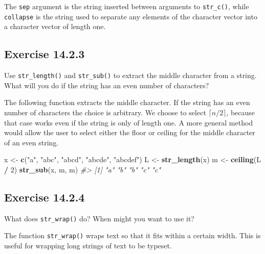 \documentclass[]{book}
\newenvironment{Shaded}{\begin{snugshade}}{\end{snugshade}}
\newcommand{\CommentTok}[1]{\textcolor[rgb]{0.56,0.35,0.01}{\textit{#1}}}
\newcommand{\DecValTok}[1]{\textcolor[rgb]{0.00,0.00,0.81}{#1}}
\newcommand{\KeywordTok}[1]{\textcolor[rgb]{0.13,0.29,0.53}{\textbf{#1}}}
\newcommand{\NormalTok}[1]{#1}
\newcommand{\OperatorTok}[1]{\textcolor[rgb]{0.81,0.36,0.00}{\textbf{#1}}}
\newcommand{\StringTok}[1]{\textcolor[rgb]{0.31,0.60,0.02}{#1}}
\theoremstyle{plain}
\theoremstyle{remark}
\begin{document}
The \texttt{sep} argument is the string inserted between arguments to
\texttt{str\_c()}, while \texttt{collapse} is the string used to
separate any elements of the character vector into a character vector of
length one.

\hypertarget{exercise-14.2.3}{%
\subsection*{\texorpdfstring{Exercise
{14.2.3}}{Exercise 14.2.3}}\label{exercise-14.2.3}}

Use \texttt{str\_length()} and \texttt{str\_sub()} to extract the middle
character from a string. What will you do if the string has an even
number of characters?

The following function extracts the middle character. If the string has
an even number of characters the choice is arbitrary. We choose to
select \(\lceil n / 2 \rceil\), because that case works even if the
string is only of length one. A more general method would allow the user
to select either the floor or ceiling for the middle character of an
even string.

\begin{Shaded}
\begin{Highlighting}[]
\NormalTok{x <-}\StringTok{ }\KeywordTok{c}\NormalTok{(}\StringTok{"a"}\NormalTok{, }\StringTok{"abc"}\NormalTok{, }\StringTok{"abcd"}\NormalTok{, }\StringTok{"abcde"}\NormalTok{, }\StringTok{"abcdef"}\NormalTok{)}
\NormalTok{L <-}\StringTok{ }\KeywordTok{str_length}\NormalTok{(x)}
\NormalTok{m <-}\StringTok{ }\KeywordTok{ceiling}\NormalTok{(L }\OperatorTok{/}\StringTok{ }\DecValTok{2}\NormalTok{)}
\KeywordTok{str_sub}\NormalTok{(x, m, m)}
\CommentTok{#> [1] "a" "b" "b" "c" "c"}
\end{Highlighting}
\end{Shaded}

\hypertarget{exercise-14.2.4}{%
\subsection*{\texorpdfstring{Exercise
{14.2.4}}{Exercise 14.2.4}}\label{exercise-14.2.4}}

What does \texttt{str\_wrap()} do? When might you want to use it?

The function \texttt{str\_wrap()} wraps text so that it fits within a
certain width. This is useful for wrapping long strings of text to be
typeset.
\end{document}

